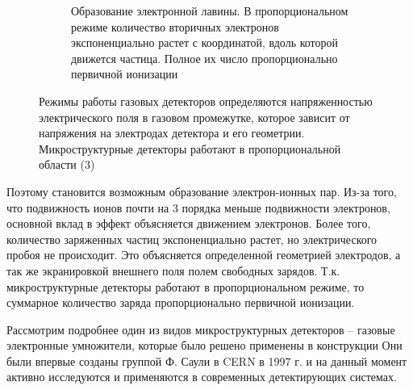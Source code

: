 \begin{figure}[h]
\begin{subfigure}{.45\textwidth}
		\caption{Образование электронной лавины. В пропорциональном режиме количество вторичных электронов экспоненциально растет с координатой, вдоль которой движется частица. Полное их число пропорционально первичной ионизации}
	\end{subfigure}%
	\caption{Режимы работы газовых детекторов определяются напряженностью электрического поля в газовом промежутке, которое зависит от напряжения на электродах детектора и его геометрии. Микроструктурные детекторы работают в пропорциональной области (3)}
	\label{fig:gas_discharge}
\end{figure}
 Поэтому становится возможным образование электрон-ионных пар. Из-за того, что подвижность ионов почти на 3 порядка меньше подвижности электронов, основной вклад в эффект объясняется движением электронов. Более того, количество заряженных частиц экспоненциально растет, но электрического пробоя не происходит. Это объясняется определенной геометрией электродов, а так же экранировкой внешнего поля полем свободных зарядов. Т.к. микроструктурные детекторы работают в пропорциональном режиме, то суммарное количество заряда пропорционально первичной ионизации.
 \par Рассмотрим подробнее один из видов микроструктурных детекторов -- газовые электронные умножители, которые было решено применены в конструкции  Они были впервые созданы группой Ф. Саули в CERN в 1997 г. и на данный момент активно исследуются и применяются в современных детектирующих системах.  
 
 
 



